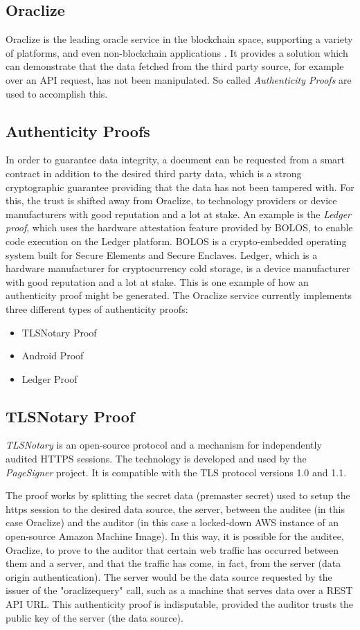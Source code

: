 \subsection{Oraclize}
Oraclize is the leading oracle service in the blockchain space, supporting a variety of platforms, and even non-blockchain applications \cite{oraclizedoc}. It provides a solution which can demonstrate that the data fetched from the third party source, for example over an API request, has not been manipulated. So called \emph{Authenticity Proofs} are used to accomplish this.
\subsection*{Authenticity Proofs}
In order to guarantee data integrity, a document can be requested from a smart contract in addition to the desired third party data, which is a strong cryptographic guarantee providing that the data has not been tampered with. For this, the trust is shifted away from Oraclize, to technology providers or device manufacturers with good reputation and a lot at stake. An example is the \emph{Ledger proof}, which uses the hardware attestation feature provided by BOLOS, to enable code execution on the Ledger platform. BOLOS is a crypto-embedded operating system built for Secure Elements and Secure Enclaves. Ledger, which is a hardware manufacturer for cryptocurrency cold storage, is a device manufacturer with good reputation and a lot at stake. This is one example of how an authenticity proof might be generated. The Oraclize service currently implements three different types of authenticity proofs:
\begin{itemize}
	\item TLSNotary Proof
	\item Android Proof
	\item Ledger Proof
\end{itemize}
\subsection*{TLSNotary Proof}
\emph{TLSNotary} is an open-source protocol and a mechanism for independently audited HTTPS sessions. The technology is developed and used by the \emph{PageSigner} project\cite{pagesigner}. It is compatible with the TLS protocol versions 1.0 and 1.1.

The proof works by splitting the secret data (premaster secret) used to setup the https session to the desired data source, \ie the server, between the auditee (in this case Oraclize) and the auditor (in this case a locked-down AWS instance of an open-source Amazon Machine Image). In this way, it is possible for the auditee, Oraclize, to prove to the auditor that certain web traffic has occurred between them and a server, and that the traffic has come, in fact, from the server (data origin authentication). The server would be the data source requested by the issuer of the "oraclize\textunderscore query" call, such as a machine that serves data over a REST API URL. This authenticity proof is indisputable, provided the auditor trusts the public key of the server (the data source)\cite{tlsnotarywhitepaper}\cite{oraclizedoc}.

